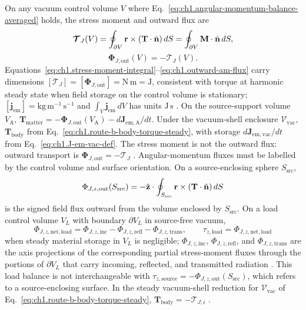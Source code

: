 On any vacuum control volume $V$ where Eq.~\eqref{eq:ch1.angular-momentum-balance-averaged} holds, the stress moment and outward flux are
\begin{equation}
\label{eq:ch1.stress-moment-integral}
\boldsymbol{\mathcal{T}}_J(V)
=\oint_{\partial V}\mathbf{r}\times(\mathbf{T}\cdot\hat{\mathbf{n}})\,dS
=\oint_{\partial V}\mathbf{M}\cdot\hat{\mathbf{n}}\,dS,
\end{equation}
\begin{equation}
\label{eq:ch1.outward-am-flux}
\boldsymbol{\Phi}_{J,\mathrm{out}}(V)
=-\boldsymbol{\mathcal{T}}_J(V).
\end{equation}
Equations~\eqref{eq:ch1.stress-moment-integral}--\eqref{eq:ch1.outward-am-flux} carry dimensions $[\boldsymbol{\mathcal{T}}_J]=[\boldsymbol{\Phi}_{J,\mathrm{out}}]=\mathrm{N\,m}=\mathrm{J}$, consistent with torque at harmonic steady state when field storage on the control volume is stationary; $[\mathbf{j}_{\mathrm{em}}]=\mathrm{kg\,m^{-1}\,s^{-1}}$ and $\int_V\mathbf{j}_{\mathrm{em}}\,dV$ has units $\mathrm{J\,s}$ \cite{stratton1941}.
On the source-support volume $V_{\mathrm{A}}$, $\mathbf{T}_{\mathrm{matter}}=-\boldsymbol{\Phi}_{J,\mathrm{out}}(V_{\mathrm{A}})-d\mathbf{J}_{\mathrm{em,A}}/dt$. Under the vacuum-shell enclosure $\mathcal{V}_{\mathrm{vac}}$, $\mathbf{T}_{\mathrm{body}}$ from Eq.~\eqref{eq:ch1.route-b-body-torque-steady}, with storage $d\mathbf{J}_{\mathrm{em,vac}}/dt$ from Eq.~\eqref{eq:ch1.J-em-vac-def}. The stress moment is not the outward flux: outward transport is $\boldsymbol{\Phi}_{J,\mathrm{out}}=-\boldsymbol{\mathcal{T}}_J$ \cite{stratton1941,beth1936}. Angular-momentum fluxes must be labelled by the control volume and surface orientation. On a source-enclosing sphere $S_{\mathrm{src}}$,
\begin{equation}
\label{eq:ch1.am-flux-source-balance}
\Phi_{J,z,\mathrm{out}}(S_{\mathrm{src}})
=-\hat{\mathbf{z}}\cdot\oint_{S_{\mathrm{src}}}\mathbf{r}\times(\mathbf{T}\cdot\hat{\mathbf{n}})\,dS
\end{equation}
is the signed field flux outward from the volume enclosed by $S_{\mathrm{src}}$. On a load control volume $V_L$ with boundary $\partial V_L$ in source-free vacuum,
\begin{equation}
\label{eq:ch1.am-flux-load-balance}
\Phi_{J,z,\mathrm{net,load}}
=\Phi_{J,z,\mathrm{inc}}-\Phi_{J,z,\mathrm{refl}}-\Phi_{J,z,\mathrm{trans}},
\qquad
\tau_{z,\mathrm{load}}=\Phi_{J,z,\mathrm{net,load}}
\end{equation}
when steady material storage in $V_L$ is negligible; $\Phi_{J,z,\mathrm{inc}}$, $\Phi_{J,z,\mathrm{refl}}$, and $\Phi_{J,z,\mathrm{trans}}$ are the axis projections of the corresponding partial stress-moment fluxes through the portions of $\partial V_L$ that carry incoming, reflected, and transmitted radiation \cite{beth1936,stratton1941}. This load balance is not interchangeable with $\tau_{z,\mathrm{source}}=-\Phi_{J,z,\mathrm{out}}(S_{\mathrm{src}})$, which refers to a source-enclosing surface. In the steady vacuum-shell reduction for $\mathcal{V}_{\mathrm{vac}}$ of Eq.~\eqref{eq:ch1.route-b-body-torque-steady}, $\mathbf{T}_{\mathrm{body}}=-\boldsymbol{\mathcal{T}}_{J,i}$ \cite{beth1936}.

